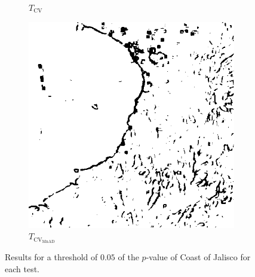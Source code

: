 \documentclass[aspectratio=1610,10pt]{beamer}
\begin{document}
\begin{frame}
\begin{figure}[H]
\begin{subfigure}[b]{0.3\textwidth}
    \caption{$T_\text{CV}$}
    \label{fig:Mexico_crops_0.05-2}
  \end{subfigure}
  \hfill
  \begin{subfigure}[b]{0.3\textwidth}
    \centering
    \includegraphics[width=\textwidth]{../../Figures/PNG/mnad_005_mexico_512}
     \caption{$T_{\text{CV}_{\text{MnAD}}}$}
    \label{fig:Mexico_crops_0.05-3}
  \end{subfigure}
  \caption{Results for a threshold of $0.05$ of the $p$-value of Coast of Jalisco for each test. }
  \label{fig:Mexico_crops_0.05}
\end{figure}
\end{frame} 
\end{document}

